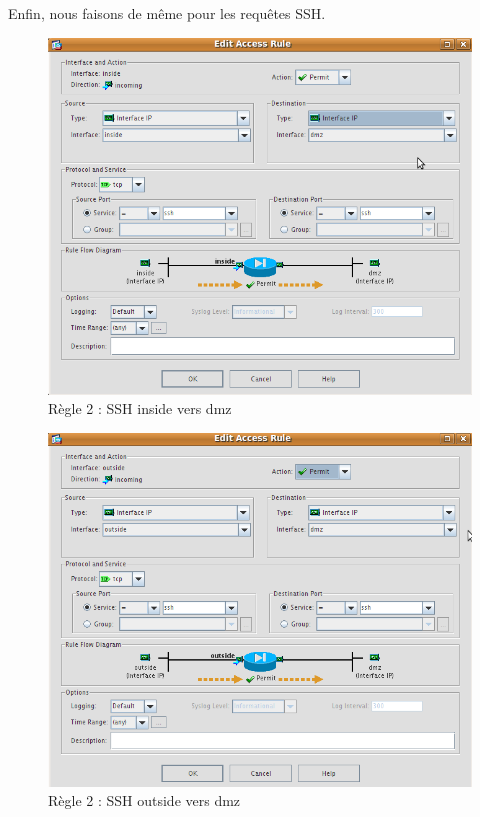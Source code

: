 \documentclass[a4paper,12pt]{article}
\begin{document}
\newpage
Enfin, nous faisons de même pour les requêtes SSH.
\begin{figure}[H]
	\center
	\includegraphics[width=12cm]{img/12-sshinsidesmz.png}
	\caption{Règle 2 : SSH inside vers dmz}
\end{figure}
\begin{figure}[H]
	\center
	\includegraphics[width=12cm]{img/13-sshoutsidedmz.png}
	\caption{Règle 2 : SSH outside vers dmz}
\end{figure}
\end{document}
